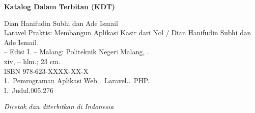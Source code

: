 \begin{titlepage}
\vspace{0.45cm}

\begin{tcolorbox}[
    enhanced,
    width=\linewidth,
    colback=white,
    colframe=black!45,
    boxrule=0.5pt,
    arc=1.5pt,
    left=8pt,
    right=8pt,
    top=8pt,
    bottom=8pt
]
{\bfseries\sffamily Katalog Dalam Terbitan (KDT)}\par
\vspace{0.25cm}
\begingroup
\setlength{\parindent}{0pt}
Dian Hanifudin Subhi dan Ade Ismail\\
\hspace*{1em}Laravel Praktis: Membangun Aplikasi Kasir dari Nol / Dian
Hanifudin Subhi dan Ade Ismail.\\
\hspace*{1em}-- Edisi I. -- Malang: Politeknik Negeri Malang, \the\year.\\
\hspace*{1em}xiv, -- hlm.; 23 cm.\\[0.2cm]
ISBN 978-623-XXXX-XX-X\\[0.2cm]
1.~Pemrograman Aplikasi Web..~Laravel..~PHP.\\
I.~Judul.\hfill 005.276
\endgroup
\end{tcolorbox}

\vfill

{\small\itshape Dicetak dan diterbitkan di Indonesia\par}

\end{titlepage}

\cleardoublepage
